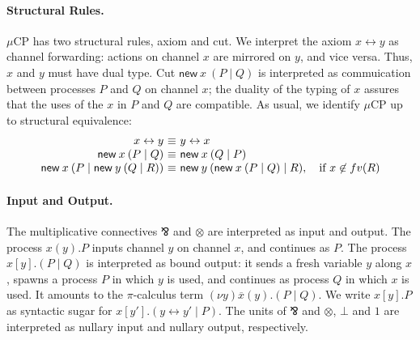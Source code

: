 \documentclass[orivec,envcountsame]{llncs}
\makeatletter
\newcommand{\parr}{\mathbin\bindnasrepma}
\newcommand{\cpdual}[1]{#1^\perp}
\newcommand{\mkwd}[1]{\mathsf{#1}}
\newcommand{\link}[2]{#1 \leftrightarrow #2}
\newcommand{\cut}[4]{\mkwd{new}\:#1 \: (#3 \mid #4)}
\newcommand{\mucp}{$\mu\mathrm{CP}$\xspace}
\newcommand{\ba}{\begin{array}}
\newcommand{\ea}{\end{array}}
\newenvironment{equations}{\[\ba{@{}r@{~}c@{~}l@{}}}{\ea\]}
\makeatother
\begin{document}
\paragraph{Structural Rules.}

\mucp has two structural rules, axiom and cut. We interpret the axiom $\link{x}{y}$ as channel
forwarding: actions on channel $x$ are mirrored on $y$, and vice versa. Thus, $x$ and $y$ must have
dual type. Cut $\cut{x}{A}{P}{Q}$ is interpreted as commuication between processes $P$ and $Q$ on
channel $x$; the duality of the typing of $x$ assures that the uses of the $x$ in $P$ and $Q$ are
compatible. As usual, we identify \mucp up to structural equivalence:
\small\begin{equations}
  \link{x}{y} &\equiv& \link{y}{x} \\
  \cut{x}{A}{P}{Q} &\equiv& \cut{x}{\cpdual{A}}{Q}{P} \\
  \cut{x}{A}{P}{\cut{y}{B}{Q}{R}} &\equiv& \cut{y}{B}{\cut{x}{A}{P}{Q}}{R}, \quad \text{if $x \not\in fv(R)$} \\
\end{equations}\normalsize%


\paragraph{Input and Output.}

The multiplicative connectives $\parr$ and $\otimes$ are interpreted as input and output. The
process $x(y).P$ inputs channel $y$ on channel $x$, and continues as $P$. The process $x[y].(P \mid
Q)$ is interpreted as bound output: it sends a fresh variable $y$ along $x$, spawns a process $P$ in
which $y$ is used, and continues as process $Q$ in which $x$ is used.  It amounts to the
$\pi$-calculus term $(\nu y) \overline{x}(y).(P \mid Q)$. We write $x[y].P$ as syntactic sugar for
$x[y'].(\link{y}{y'} \mid P)$. The units of $\parr$ and $\otimes$, $\bot$ and $1$ are interpreted as
nullary input and nullary output, respectively.
\end{document}
